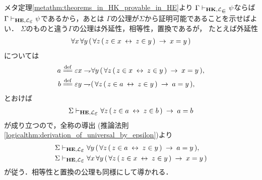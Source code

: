 	\begin{metaprf}
		メタ定理\ref{metathm:theorems_in_HK_provable_in_HE}より
		$\Gamma \provable{\mbox{{\bf HK}},\lang{\in}} \psi$ならば
		$\Gamma \provable{\mbox{{\bf HE}},\lang{\varepsilon}} \psi$であるから，あとは
		$\Gamma$の公理が$\Sigma$から証明可能であることを示せばよい．
		$\Sigma$のものと違う$\Gamma$の公理は外延性，相等性，置換であるが，
		たとえば外延性
		\begin{align}
			\forall x\, \forall y\, (\, \forall z\, 
			(\, z \in x \hspace{0.25em}\leftrightarrow\hspace{0.25em} z \in y\, ) \hspace{0.25em}\rightarrow\hspace{0.25em} x = y\, )
		\end{align}
		については
		\begin{align}
			a &\defeq \varepsilon x \negation \forall y\, (\, \forall z\, 
			(\, z \in x \lrarrow z \in y\, ) \rarrow x = y\, ), \\
			b &\defeq \varepsilon y \negation (\, \forall z\, 
			(\, z \in a \lrarrow z \in y\, ) \rarrow a = y\, ),
		\end{align}
		とおけば
		\begin{align}
			\Sigma \provable{\mbox{{\bf HE}},\lang{\varepsilon}} \forall z\, (\, z \in a \lrarrow z \in b\, ) \rarrow a = b
		\end{align}
		が成り立つので，全称の導出
		(推論法則\ref{logicalthm:derivation_of_universal_by_epsilon})より
		\begin{align}
			\Sigma &\provable{\mbox{{\bf HE}},\lang{\varepsilon}} \forall y\, (\, \forall z\, 
			(\, z \in a \lrarrow z \in y\, ) \rarrow a = y\, ), \\
			\Sigma &\provable{\mbox{{\bf HE}},\lang{\varepsilon}} \forall x\, \forall y\, (\, \forall z\, 
			(\, z \in x \lrarrow z \in y\, ) \rarrow x = y\, )
		\end{align}
		が従う．相等性と置換の公理も同様にして導かれる．
		\QED
	\end{metaprf}